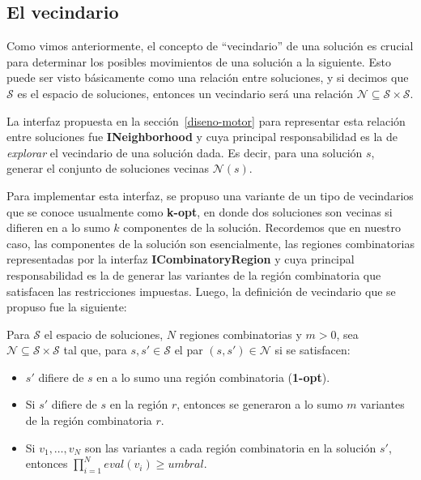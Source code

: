 \subsection{El vecindario}

Como vimos anteriormente, el concepto de ``vecindario'' de una soluci\'on es
crucial para determinar los posibles movimientos de una soluci\'on a la
siguiente. Esto puede ser visto b\'asicamente como una relaci\'on entre
soluciones, y si decimos que $\mathcal{S}$ es el espacio de soluciones, entonces
un vecindario ser\'a una relaci\'on $\mathcal{N} \subseteq \mathcal{S} \times
\mathcal{S}$.

La interfaz propuesta en la secci\'on~\ref{diseno-motor} para representar esta
relaci\'on entre soluciones fue \textbf{INeighborhood} y cuya principal
responsabilidad es la de \textit{explorar} el vecindario de una soluci\'on dada.
Es decir, para una soluci\'on $s$, generar el conjunto de soluciones vecinas
$\mathcal{N}(s)$. 

Para implementar esta interfaz, se propuso una variante de un tipo de
vecindarios que se conoce usualmente como \textbf{k-opt}, en donde dos
soluciones son vecinas si difieren en a lo sumo $k$ componentes de la
soluci\'on. Recordemos que en nuestro caso, las componentes de la soluci\'on son
esencialmente, las regiones combinatorias representadas por la interfaz
\textbf{ICombinatoryRegion} y cuya principal responsabilidad es la de generar
las variantes de la regi\'on combinatoria que satisfacen las restricciones
impuestas. Luego, la definici\'on de vecindario que se propuso fue la siguiente:

\begin{definition}
 Para $\mathcal{S}$ el espacio de soluciones, $N$ regiones combinatorias y
$m>0$, sea $\mathcal{N} \subseteq \mathcal{S} \times \mathcal{S}$ tal que,
para $s, s' \in \mathcal{S}$ el par $(s,s') \in \mathcal{N}$ si se satisfacen:
\begin{itemize}
 \item $s'$ difiere de $s$ en a lo sumo una regi\'on combinatoria
(\textbf{1-opt}).
 \item Si $s'$ difiere de $s$ en la regi\'on $r$, entonces se generaron a lo
sumo $m$ variantes de la regi\'on combinatoria $r$.
 \item Si $v_{1}, \dots, v_{N}$ son las variantes a cada regi\'on combinatoria
en la soluci\'on $s'$, entonces $\prod_{i=1}^{N} eval(v_{i}) \ge umbral$.
\end{itemize}
\end{definition}

